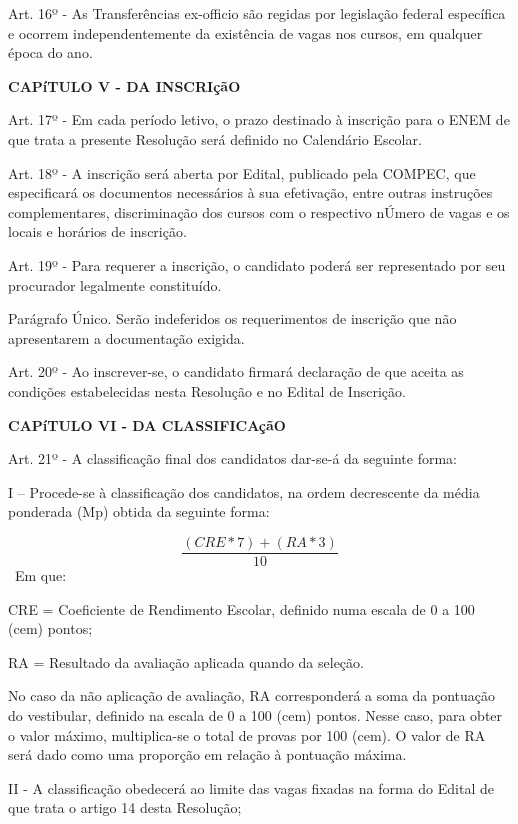 \vspace{1mm}
Art. 16º - As Transferências ex-officio são regidas por legislação federal específica e ocorrem independentemente da existência de vagas nos cursos, em qualquer época do ano.

\vspace{4mm}
\textbf{CAPíTULO V - DA INSCRIçãO}
\vspace{4mm}

Art. 17º - Em cada período letivo, o prazo destinado à inscrição para o ENEM de que trata a presente Resolução será definido no Calendário Escolar.

Art. 18º - A inscrição será aberta por Edital, publicado pela COMPEC, que especificará os documentos necessários à sua efetivação, entre outras instruções complementares, discriminação dos cursos com o respectivo nÚmero de vagas e os locais e horários de inscrição.

Art. 19º - Para requerer a inscrição, o candidato poderá ser representado por seu procurador legalmente constituído.

Parágrafo Único. Serão indeferidos os requerimentos de inscrição que não apresentarem a documentação exigida.

Art. 20º - Ao inscrever-se, o candidato firmará declaração de que aceita as condições estabelecidas nesta Resolução e no Edital de Inscrição.

\vspace{4mm}
\textbf{CAPíTULO VI - DA CLASSIFICAçãO}
\vspace{4mm}

Art. 21º - A classificação final dos candidatos dar-se-á da seguinte forma:

I – Procede-se à classificação dos candidatos, na ordem decrescente da média ponderada (Mp) obtida da seguinte forma:

$$ 
\frac{(CRE*7) + (RA*3)}{10}
$$
~Em que:

CRE = Coeficiente de Rendimento Escolar, definido numa escala de 0 a 100 (cem) pontos;

RA = Resultado da avaliação aplicada quando da seleção.

No caso da não aplicação de avaliação, RA corresponderá a soma da pontuação do vestibular, definido na escala de 0 a 100 (cem) pontos. Nesse caso, para obter o valor máximo, multiplica-se o total de provas por 100 (cem). O valor de RA será dado como uma proporção em relação à pontuação máxima.

II - A classificação obedecerá ao limite das vagas fixadas na forma do Edital de que trata o artigo 14 desta Resolução;


